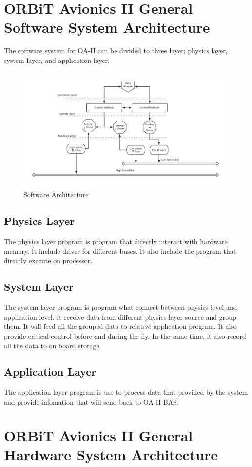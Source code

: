 \documentclass[12pt,article]{memoir}
\begin{document}
\chapter{ORBiT Avionics II General Software System Architecture}
The software system for OA-II can be divided to three layer: physics layer, system layer, and application layer.
\begin{figure}[htp]
\includegraphics[width=\textwidth]{softarch.png}
\caption{Software Architecture}	
\end{figure}
\section{Physics Layer}
The physics layer program is program that directly interact with hardware memory. It include driver for different buses. It also include the program that directly execute on processor.
\section{System Layer}
The system layer program is program what connect between physics level and application level. It receive data from different physics layer source and group them. It will feed all the grouped data to relative application program. It also provide critical control before and during the fly. In the same time, it also record all the data to on board storage.
\section{Application Layer}
The application layer program is use to process data that provided by the system and provide infomation that will send back to OA-II BAS.\\
\chapter{ORBiT Avionics II General Hardware System Architecture}
\end{document}
